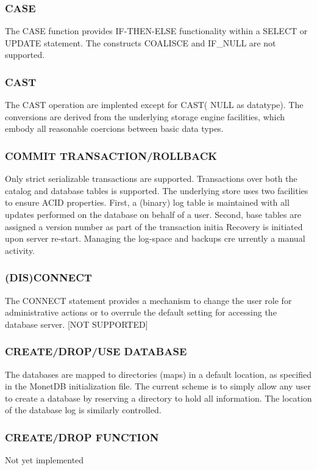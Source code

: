 \documentclass[10pt,twocolumn,fleqn]{article}
\begin{document}
\subsubsection*{CASE}
The CASE function provides IF-THEN-ELSE functionality within
a SELECT or UPDATE statement. The constructs COALISCE and IF\_NULL are
not supported.

\subsubsection*{CAST}
The CAST operation  are implented except for CAST( NULL as datatype).
The conversions are derived from the underlying storage engine facilities,
which embody all reasonable coercions between basic data types.

\subsubsection*{COMMIT TRANSACTION/ROLLBACK }
Only strict serializable transactions are supported.
Transactions over both the catalog and database tables is supported.
The underlying store uses two facilities to ensure ACID properties.
First, a (binary) log table is maintained with all updates performed
on the database on behalf of a user. Second, base tables are assigned
a version number as part of the transaction initia
Recovery is initiated upon server re-start.
Managing the log-space and backups cre urrently a manual activity.

\subsubsection*{(DIS)CONNECT }

The CONNECT statement provides a mechanism to change the user role
for administrative actions or to overrule the default setting for
accessing the database server. [NOT SUPPORTED]

\subsubsection*{CREATE/DROP/USE DATABASE}
The databases are mapped to directories (maps) in a default location, as 
specified in the MonetDB initialization file. The current scheme is 
to simply allow any user to create a database by reserving a
directory to hold all information. The location of the database
log is similarly controlled.

\subsubsection*{CREATE/DROP FUNCTION}
Not yet implemented
\end{document}
